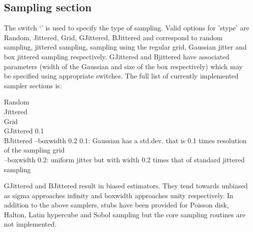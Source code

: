 \subsection{Sampling section}
\label{subsec:ptanalyzer}
The switch `' is used to specify the type of sampling. Valid options for 'stype' are Random, Jittered, Grid, GJittered, BJittered and correspond to random sampling, jittered sampling, sampling using the regular grid, Gaussian jitter and box jittered sampling respectively. GJittered and Bjittered have associated parameters (width of the Gaussian and size of the box respectively) which may be specified using appropriate switches. The full list of currently implemented sampler sections is:
\begin{tcolorbox}
    Random \\
    Jittered \\
    Grid \\
    GJittered  0.1 \\
    BJittered --boxwidth 0.2 
\tcblower
    0.1: Gaussian has a std.dev. that is 0.1 times resolution of the sampling grid \\
   --boxwidth 0.2: uniform jitter but with width 0.2 times that of standard jittered sampling 
\end{tcolorbox}
GJittered and BJittered result in biased estimators. They tend towards unbiased as sigma approaches infinity and boxwidth approaches unity respectively. In addition to the above samplers, stubs have been provided for Poisson disk, Halton, Latin hypercube and Sobol sampling but the core sampling routines are not implemented. 

